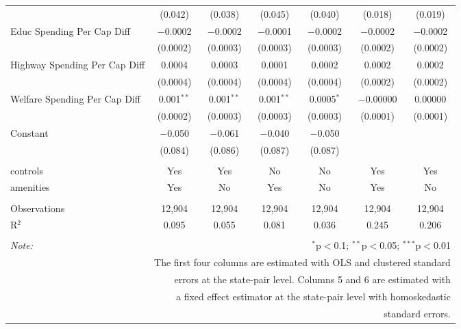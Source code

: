 \begin{table}[!htbp]
\begin{tabular}{@{\extracolsep{5pt}}lcccccc}
  & (0.042) & (0.038) & (0.045) & (0.040) & (0.018) & (0.019) \\ 
  Educ Spending Per Cap Diff & $-$0.0002 & $-$0.0002 & $-$0.0001 & $-$0.0002 & $-$0.0002 & $-$0.0002 \\ 
  & (0.0002) & (0.0003) & (0.0003) & (0.0003) & (0.0002) & (0.0002) \\ 
  Highway Spending Per Cap Diff & 0.0004 & 0.0003 & 0.0001 & 0.0002 & 0.0002 & 0.0002 \\ 
  & (0.0004) & (0.0004) & (0.0004) & (0.0004) & (0.0002) & (0.0002) \\ 
  Welfare Spending Per Cap Diff & 0.001$^{**}$ & 0.001$^{**}$ & 0.001$^{**}$ & 0.0005$^{*}$ & $-$0.00000 & 0.00000 \\ 
  & (0.0002) & (0.0003) & (0.0003) & (0.0003) & (0.0001) & (0.0001) \\ 
  Constant & $-$0.050 & $-$0.061 & $-$0.040 & $-$0.050 &  &  \\ 
  & (0.084) & (0.086) & (0.087) & (0.087) &  &  \\ 
 \hline \\[-1.8ex] 
controls & Yes & Yes & No & No & Yes & Yes \\ 
amenities & Yes & No & Yes & No & Yes & No \\ 
\hline \\[-1.8ex] 
Observations & 12,904 & 12,904 & 12,904 & 12,904 & 12,904 & 12,904 \\ 
R$^{2}$ & 0.095 & 0.055 & 0.081 & 0.036 & 0.245 & 0.206 \\ 
\hline 
\hline \\[-1.8ex] 
\textit{Note:}  & \multicolumn{6}{r}{$^{*}$p$<$0.1; $^{**}$p$<$0.05; $^{***}$p$<$0.01} \\ 
 & \multicolumn{6}{r}{The first four columns are estimated with OLS and clustered standard} \\ 
 & \multicolumn{6}{r}{ errors at the state-pair level. Columns 5 and 6 are estimated with} \\ 
 & \multicolumn{6}{r}{a fixed effect estimator at the state-pair level with homoskedastic} \\ 
 & \multicolumn{6}{r}{standard errors.} \\ 
\end{tabular} 
\end{table} 
